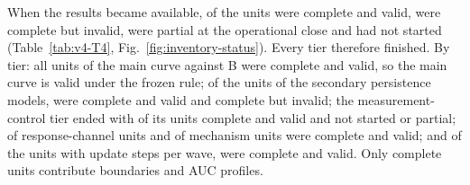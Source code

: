 When the results became available,  of the  units were complete and valid,  were complete but invalid,  were partial at the operational close and  had not started (Table~\ref{tab:v4-T4}, Fig.~\ref{fig:inventory-status}). Every tier therefore finished. By tier: all  units of the main curve against B were complete and valid, so the main curve is valid under the frozen rule; of the  units of the secondary persistence models,  were complete and valid and  complete but invalid; the measurement-control tier ended with  of its  units complete and valid and  not started or partial;  of  response-channel units and  of  mechanism units were complete and valid; and of the  units with  update steps per wave,  were complete and valid. Only complete units contribute boundaries and AUC profiles.

